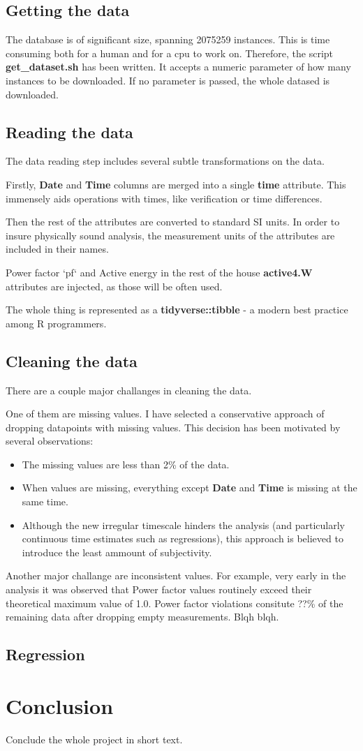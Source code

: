 \documentclass[11pt]{article}
\newcommand{\code}[1]{\textbf{#1}}
\newcommand{\para}[0]{\par\vspace{0.5cm}}
\begin{document}
\subsection{Getting the data}
The database is of significant size, spanning 2075259 instances.
This is time consuming both for a human and for a cpu to work on.
Therefore, the script \code{get\_dataset.sh} has been written.
It accepts a numeric parameter of how many instances to be downloaded.
If no parameter is passed, the whole datased is downloaded.

\subsection{Reading the data}
The data reading step includes several subtle transformations on the data.
\para
Firstly, \code{Date} and \code{Time} columns are merged into a single \code{time} attribute.
This immensely aids operations with times, like verification or time differences.
\para
Then the rest of the attributes are converted to standard SI units.
In order to insure physically sound analysis, the measurement units of the attributes are included in their names.
\para
Power factor `pf` and Active energy in the rest of the house \code{active4.W} attributes are injected, as those will be often used.
\para
The whole thing is represented as a \code{tidyverse::tibble} - a modern best practice among R programmers. 

\subsection{Cleaning the data}
There are a couple major challanges in cleaning the data.
\para
One of them are missing values.
I have selected a conservative approach of dropping datapoints with missing values.
This decision has been motivated by several observations:
\begin{itemize}
    \item{The missing values are less than 2\% of the data.}
    \item{When values are missing, everything except \code{Date} and \code{Time} is missing at the same time.}
    \item{Although the new irregular timescale hinders the analysis (and particularly continuous time estimates such as regressions), this approach is believed to introduce the least ammount of subjectivity.}
\end{itemize}
\para
Another major challange are inconsistent values.
For example, very early in the analysis it was observed that Power factor values routinely exceed their theoretical maximum value of 1.0.
Power factor violations consitute ??\% of the remaining data after dropping empty measurements.
Blqh blqh.

\subsection{Regression}
\section{Conclusion}
Conclude the whole project in short text.


 
\end{document}
